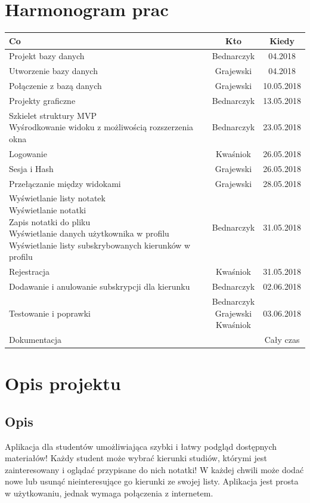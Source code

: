 \documentclass[12pt,a4paper]{article}
\begin{document}
	\section{Harmonogram prac}
	\begin{tabular}{|p{}|c|c|}
	\hline
	Co & Kto & Kiedy \\	\hline\hline
	Projekt bazy danych & Bednarczyk & 04.2018 \\ \hline
	Utworzenie bazy danych & Grajewski & 04.2018 \\ \hline
	Połączenie z bazą danych & Grajewski & 10.05.2018 \\ \hline
	Projekty graficzne & Bednarczyk & 13.05.2018 \\ \hline
	\makecell[l]{Szkielet struktury MVP \\
	Wyśrodkowanie widoku z możliwością rozszerzenia okna} & Bednarczyk & 23.05.2018 \\ \hline
	Logowanie & Kwaśniok & 26.05.2018 \\ \hline
	Sesja i Hash & Grajewski & 26.05.2018 \\ \hline
	Przełączanie między widokami & Grajewski & 28.05.2018 \\ \hline
	\makecell[l]{Wyświetlanie listy notatek\\
	Wyświetlanie notatki\\
	Zapis notatki do pliku\\
	Wyświetlanie danych użytkownika w profilu\\
	Wyświetlanie listy subskrybowanych kierunków w profilu}& Bednarczyk & 31.05.2018 \\ \hline
	Rejestracja & Kwaśniok & 31.05.2018\\ \hline
	Dodawanie i anulowanie subskrypcji dla kierunku & Bednarczyk & 02.06.2018 \\ \hline
	Testowanie i poprawki & \makecell{Bednarczyk \\Grajewski \\Kwaśniok} & 03.06.2018 \\ \hline
	\hline
	Dokumentacja & \makecell{Bednarczyk} & Cały czas\\ \hline
	\end{tabular}
	\clearpage
	\section{Opis projektu}
		\subsection{Opis}
			Aplikacja dla studentów umożliwiająca szybki i łatwy podgląd dostępnych materiałów! Każdy student może wybrać kierunki studiów, którymi jest zainteresowany i oglądać przypisane do nich notatki! W każdej chwili  może dodać nowe lub usunąć nieinteresujące go kierunki ze swojej listy. Aplikacja jest prosta w użytkowaniu, jednak wymaga połączenia z internetem.
\end{document}
